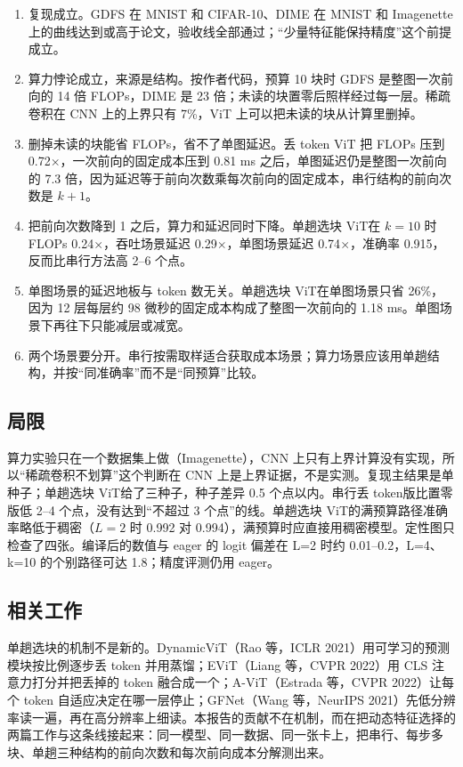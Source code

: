 \documentclass[11pt,a4paper,UTF8,fontset=none]{ctexart}
\newcommand{\dense}{整图一次前向}
\newcommand{\tokdrop}{丢 token}
\newcommand{\onepass}{单趟选块 ViT}
\begin{document}
\begin{enumerate}
\item 复现成立。GDFS 在 MNIST 和 CIFAR-10、DIME 在 MNIST 和 Imagenette 上的曲线达到或高于论文，验收线全部通过；“少量特征能保持精度”这个前提成立。
\item 算力悖论成立，来源是结构。按作者代码，预算 10 块时 GDFS 是\dense 的 14 倍 FLOPs，DIME 是 23 倍；未读的块置零后照样经过每一层。稀疏卷积在 CNN 上的上界只有 7\%，ViT 上可以把未读的块从计算里删掉。
\item 删掉未读的块能省 FLOPs，省不了单图延迟。\tokdrop{} ViT 把 FLOPs 压到 0.72$\times$，一次前向的固定成本压到 0.81 ms 之后，单图延迟仍是\dense 的 7.3 倍，因为延迟等于前向次数乘每次前向的固定成本，串行结构的前向次数是 $k+1$。
\item 把前向次数降到 1 之后，算力和延迟同时下降。\onepass{}在 $k=10$ 时 FLOPs 0.24$\times$，吞吐场景延迟 0.29$\times$，单图场景延迟 0.74$\times$，准确率 0.915，反而比串行方法高 2--6 个点。
\item 单图场景的延迟地板与 token 数无关。\onepass{}在单图场景只省 26\%，因为 12 层每层约 98 微秒的固定成本构成了\dense 的 1.18 ms。单图场景下再往下只能减层或减宽。
\item 两个场景要分开。串行按需取样适合获取成本场景；算力场景应该用单趟结构，并按“同准确率”而不是“同预算”比较。
\end{enumerate}

\subsection{局限}

算力实验只在一个数据集上做（Imagenette），CNN 上只有上界计算没有实现，所以“稀疏卷积不划算”这个判断在 CNN 上是上界证据，不是实测。复现主结果是单种子；\onepass{}给了三种子，种子差异 0.5 个点以内。串行\tokdrop{}版比置零版低 2--4 个点，没有达到“不超过 3 个点”的线。\onepass{}的满预算路径准确率略低于稠密（$L=2$ 时 0.992 对 0.994），满预算时应直接用稠密模型。定性图只检查了四张。编译后的数值与 eager 的 logit 偏差在 L=2 时约 0.01--0.2，L=4、k=10 的个别路径可达 1.8；精度评测仍用 eager。

\subsection{相关工作}

单趟选块的机制不是新的。DynamicViT（Rao 等，ICLR 2021）用可学习的预测模块按比例逐步丢 token 并用蒸馏；EViT（Liang 等，CVPR 2022）用 CLS 注意力打分并把丢掉的 token 融合成一个；A-ViT（Estrada 等，CVPR 2022）让每个 token 自适应决定在哪一层停止；GFNet（Wang 等，NeurIPS 2021）先低分辨率读一遍，再在高分辨率上细读。本报告的贡献不在机制，而在把动态特征选择的两篇工作与这条线接起来：同一模型、同一数据、同一张卡上，把串行、每步多块、单趟三种结构的前向次数和每次前向成本分解测出来。
\end{document}
